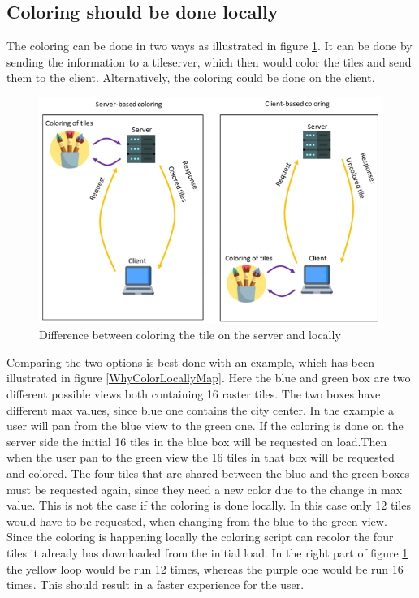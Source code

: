 \subsection{Coloring should be done locally}
The coloring can be done in two ways as illustrated in figure \ref{WhyColorLocally}. It can be done by sending the information to a tileserver, which then would color the tiles and send them to the client. Alternatively, the coloring could be done on the client. 

\begin{figure} [H]
	\centering
	\includegraphics[width=.8\textwidth]{Pictures/WhyColorLocally}
	\caption{Difference between coloring the tile on the server and locally}
	\label{WhyColorLocally}
\end{figure}

Comparing the two options is best done with an example, which has been illustrated in figure \ref{WhyColorLocallyMap}. Here the blue and green box are two different possible views both containing 16 raster tiles. The two boxes have different max values, since blue one contains the city center. In the example a user will pan from the blue view to the green one. If the coloring is done on the server side the initial 16 tiles in the blue box will be requested on load.Then when the user pan to the green view the 16 tiles in that box will be requested and colored. The four tiles that are shared between the blue and the green boxes must be requested again, since they need a new color due to the change in max value. This is not the case if the coloring is done locally. In this case only 12 tiles would have to be requested, when changing from the blue to the green view. Since the coloring is happening locally the coloring script can recolor the four tiles it already has downloaded from the initial load.  In the right part of figure \ref{WhyColorLocally} the yellow loop would be run 12 times, whereas the purple one would be run 16 times. This should result in a faster experience for the user.

